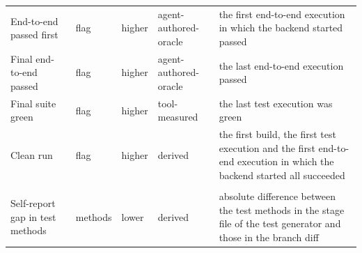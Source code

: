 \begin{tabular}{@{}p{}lllp{}@{}}
\raggedright End-to-end passed first & flag & higher & agent-authored-oracle & {\raggedright the first end-to-end execution in which the backend started passed\strut\par} \\
\raggedright Final end-to-end passed & flag & higher & agent-authored-oracle & {\raggedright the last end-to-end execution passed\strut\par} \\
\raggedright Final suite green & flag & higher & tool-measured & {\raggedright the last test execution was green\strut\par} \\
\raggedright Clean run & flag & higher & derived & {\raggedright the first build, the first test execution and the first end-to-end execution in which the backend started all succeeded\strut\par} \\
\addlinespace
\multicolumn{5}{@{}l}{\textbf{Provenance (RQ6)}} \\
\raggedright Self-report gap in test methods & methods & lower & derived & {\raggedright absolute difference between the test methods in the stage file of the test generator and those in the branch diff\strut\par} \\
\bottomrule
\end{tabular}
